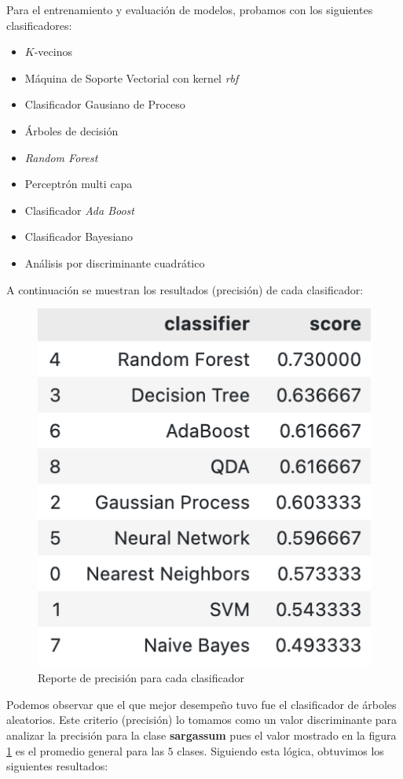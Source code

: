 \documentclass[conference]{IEEEtran}
\begin{document}
Para el entrenamiento y evaluación de modelos, probamos con los siguientes clasificadores:

\begin{itemize}
	\item $K$-vecinos
    \item Máquina de Soporte Vectorial con kernel \textit{rbf}
    \item Clasificador Gausiano de Proceso
    \item Árboles de decisión
    \item \textit{Random Forest}
    \item Perceptrón multi capa
    \item Clasificador \textit{Ada Boost}
    \item Clasificador Bayesiano
    \item Análisis por discriminante cuadrático
\end{itemize}

A continuación se muestran los resultados (precisión) de cada clasificador: 

\begin{figure}[H]
    \centering
    \includegraphics[scale=0.4]{imgs/classifiers_report.png}
    \caption{Reporte de precisión para cada clasificador}
    \label{fig:clfs}
\end{figure}

Podemos observar que el que mejor desempeño tuvo fue el clasificador de árboles aleatorios. Este criterio (precisión) lo tomamos como un valor discriminante para analizar la precisión para la clase \textbf{sargassum} pues el valor mostrado en la figura \ref{fig:clfs} es el promedio general para las $5$ clases. Siguiendo esta lógica, obtuvimos los siguientes resultados:
\end{document}
